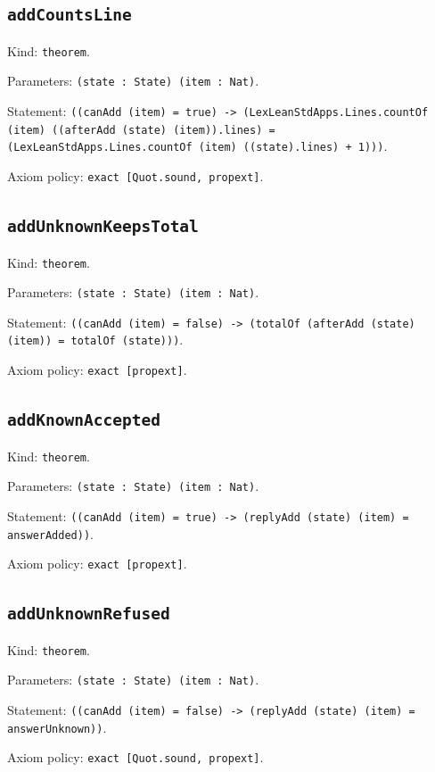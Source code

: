\documentclass[11pt]{article}
\begin{document}
\subsection*{\texttt{addCountsLine}}
\noindent Kind: \texttt{theorem}.\par
\noindent Parameters: \texttt{(state : State) (item : Nat)}.\par
\noindent Statement: \texttt{((canAdd (item) = true) -> (LexLeanStdApps.Lines.countOf (item) ((afterAdd (state) (item)).lines) = (LexLeanStdApps.Lines.countOf (item) ((state).lines) + 1)))}.\par
\noindent Axiom policy: \texttt{exact [Quot.sound, propext]}.\par
\subsection*{\texttt{addUnknownKeepsTotal}}
\noindent Kind: \texttt{theorem}.\par
\noindent Parameters: \texttt{(state : State) (item : Nat)}.\par
\noindent Statement: \texttt{((canAdd (item) = false) -> (totalOf (afterAdd (state) (item)) = totalOf (state)))}.\par
\noindent Axiom policy: \texttt{exact [propext]}.\par
\subsection*{\texttt{addKnownAccepted}}
\noindent Kind: \texttt{theorem}.\par
\noindent Parameters: \texttt{(state : State) (item : Nat)}.\par
\noindent Statement: \texttt{((canAdd (item) = true) -> (replyAdd (state) (item) = answerAdded))}.\par
\noindent Axiom policy: \texttt{exact [propext]}.\par
\subsection*{\texttt{addUnknownRefused}}
\noindent Kind: \texttt{theorem}.\par
\noindent Parameters: \texttt{(state : State) (item : Nat)}.\par
\noindent Statement: \texttt{((canAdd (item) = false) -> (replyAdd (state) (item) = answerUnknown))}.\par
\noindent Axiom policy: \texttt{exact [Quot.sound, propext]}.\par
\end{document}
